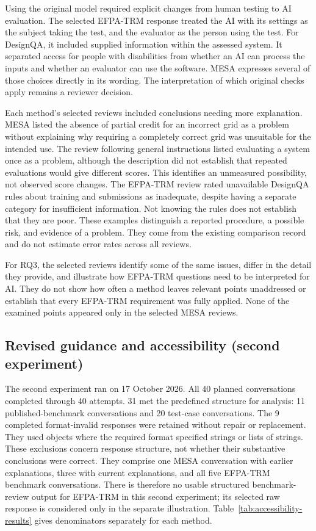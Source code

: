 \documentclass[10pt,conference]{IEEEtran}
\begin{document}
Using the original model required explicit changes from human testing to AI evaluation. The selected EFPA-TRM response treated the AI with its settings as the subject taking the test, and the evaluator as the person using the test. For DesignQA, it included supplied information within the assessed system. It separated access for people with disabilities from whether an AI can process the inputs and whether an evaluator can use the software. MESA expresses several of those choices directly in its wording. The interpretation of which original checks apply remains a reviewer decision.

Each method's selected reviews included conclusions needing more explanation. MESA listed the absence of partial credit for an incorrect grid as a problem without explaining why requiring a completely correct grid was unsuitable for the intended use. The review following general instructions listed evaluating a system once as a problem, although the description did not establish that repeated evaluations would give different scores. This identifies an unmeasured possibility, not observed score changes. The EFPA-TRM review rated unavailable DesignQA rules about training and submissions as inadequate, despite having a separate category for insufficient information. Not knowing the rules does not establish that they are poor. These examples distinguish a reported procedure, a possible risk, and evidence of a problem. They come from the existing comparison record and do not estimate error rates across all reviews.

For RQ3, the selected reviews identify some of the same issues, differ in the detail they provide, and illustrate how EFPA-TRM questions need to be interpreted for AI. They do not show how often a method leaves relevant points unaddressed or establish that every EFPA-TRM requirement was fully applied. None of the examined points appeared only in the selected MESA reviews.

\subsection{Revised guidance and accessibility (second experiment)}
The second experiment ran on 17 October 2026. All 40 planned conversations completed through 40 attempts. 31 met the predefined structure for analysis: 11 published-benchmark conversations and 20 test-case conversations. The 9 completed format-invalid responses were retained without repair or replacement. They used objects where the required format specified strings or lists of strings. These exclusions concern response structure, not whether their substantive conclusions were correct. They comprise one MESA conversation with earlier explanations, three with current explanations, and all five EFPA-TRM benchmark conversations. There is therefore no usable structured benchmark-review output for EFPA-TRM in this second experiment; its selected raw response is considered only in the separate illustration. Table~\ref{tab:accessibility-results} gives denominators separately for each method.
\end{document}
